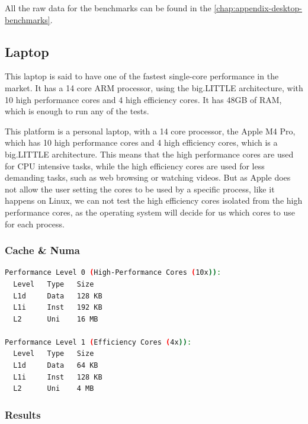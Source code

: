 All the raw data for the benchmarks can be found in the \autoref{chap:appendix-desktop-benchmarks}.

\subsection{Laptop}
This laptop is said to have one of the fastest single-core performance in the market. It has a 14 core \gls{ARM} processor, using the big.LITTLE architecture, with 10 high performance cores and 4 high efficiency cores. It has 48GB of RAM, which is enough to run any of the tests.


This platform is a personal laptop, with a 14 core processor, the Apple M4 Pro, which has 10 high performance cores and 4 high efficiency cores, which is a big.LITTLE architecture. This means that the high performance cores are used for CPU intensive tasks, while the high efficiency cores are used for less demanding tasks, such as web browsing or watching videos. But as Apple does not allow the user setting the cores to be used by a specific process, like it happens on Linux, we can not test the high efficiency cores isolated from the high performance cores, as the operating system will decide for us which cores to use for each process. 

\subsubsection{Cache \& Numa}

\begin{lstlisting}[language=bash, caption={Cache of the Apple M4 Pro by performance level}, label={lst:apple-cache}]
Performance Level 0 (High-Performance Cores (10x)):
  Level   Type   Size
  L1d     Data   128 KB
  L1i     Inst   192 KB
  L2      Uni    16 MB

Performance Level 1 (Efficiency Cores (4x)):
  Level   Type   Size
  L1d     Data   64 KB
  L1i     Inst   128 KB
  L2      Uni    4 MB
\end{lstlisting}

\subsubsection{Results}






